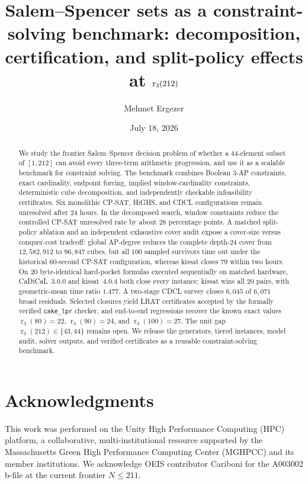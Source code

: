 \documentclass[11pt,reqno]{amsart}
\title[A Salem--Spencer constraint benchmark]{Salem--Spencer sets as a
  constraint-solving benchmark: decomposition, certification, and split-policy
  effects at $\rthree{212}$}
\author{Mehmet Ergezer}
\date{July 18, 2026}
\theoremstyle{definition}
\theoremstyle{remark}
\DeclareMathOperator{\rsymb}{r}
\newcommand{\rthree}[1]{\rsymb_{3}(#1)}
\begin{document}
\begin{abstract}
We study the frontier Salem--Spencer decision problem of whether a
$44$-element subset of $[1,212]$ can avoid every three-term arithmetic
progression, and use it as a scalable benchmark for constraint solving. The
benchmark combines Boolean 3-AP constraints, exact cardinality, endpoint
forcing, implied window-cardinality constraints, deterministic cube
decomposition, and independently checkable infeasibility certificates. Six
monolithic CP-SAT, HiGHS, and CDCL configurations remain unresolved after
$24$ hours. In the decomposed search, window constraints reduce the
controlled CP-SAT unresolved rate by about $28$ percentage points. A matched
split-policy ablation and an independent exhaustive cover audit expose a
cover-size versus conquer-cost tradeoff: global AP-degree reduces the complete
depth-24 cover from $12{,}582{,}912$ to $96{,}847$ cubes, but all $100$
sampled survivors time out under the historical $60$-second CP-SAT
configuration, whereas kissat closes $79$ within two hours. On $20$
byte-identical hard-pocket formulas executed sequentially on matched hardware,
CaDiCaL~3.0.0 and kissat~4.0.4 both close every instance; kissat wins all
$20$ pairs, with geometric-mean time ratio $1.477$. A two-stage CDCL survey
closes $6{,}045$ of $6{,}071$ broad residuals. Selected closures yield LRAT
certificates accepted by the formally verified \texttt{cake\_lpr} checker,
and end-to-end regressions recover the known exact values
$\rthree{80}=22$, $\rthree{90}=24$, and $\rthree{100}=27$. The unit gap
$\rthree{212}\in\{43,44\}$ remains open. We release the generators, tiered
instances, model audit, solver outputs, and verified certificates as a
reusable constraint-solving benchmark.
\end{abstract}

\maketitle



\section*{Acknowledgments}
This work was performed on the Unity High Performance Computing (HPC)
platform, a collaborative, multi-institutional resource supported by the
Massachusetts Green High Performance Computing Center (MGHPCC) and its member
institutions.  We acknowledge OEIS contributor Cariboni for the A003002 b-file
at the current frontier $N \leq 211$.
\end{document}
